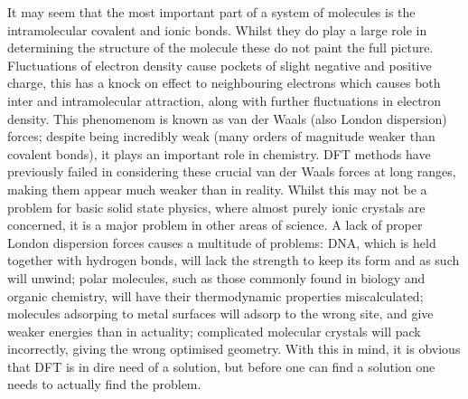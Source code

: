 \documentclass[10pt,a4paper,twocolumn,twoside]{extarticle}
\begin{document}
	It may seem that the most important part of a system of molecules is the intramolecular covalent and ionic bonds. Whilst they do play a large role in determining the structure of the molecule these do not paint the full picture. Fluctuations of electron density cause pockets of slight negative and positive charge, this has a knock on effect to neighbouring electrons which causes both inter and intramolecular attraction, along with further fluctuations in electron density. This phenomenom is known as van der Waals (also London dispersion) forces; despite being incredibly weak (many orders of magnitude weaker than covalent bonds), it plays an important role in chemistry. 
	DFT methods have previously failed in considering these crucial van der Waals forces at long ranges, making them appear much weaker than in reality. Whilst this may not be a problem for basic solid state physics, where almost purely ionic crystals are concerned, it is a major problem in other areas of science. A lack of proper London dispersion forces causes a multitude of problems: DNA, which is held together with hydrogen bonds, will lack the strength to keep its form and as such will unwind; polar molecules, such as those commonly found in biology and organic chemistry, will have their thermodynamic properties miscalculated; molecules adsorping to metal surfaces will adsorp to the wrong site, and give weaker energies than in actuality; complicated molecular crystals will pack incorrectly, giving the wrong optimised geometry.
	With this in mind, it is obvious that DFT is in dire need of a solution, but before one can find a solution one needs to actually find the problem. 
\end{document}
